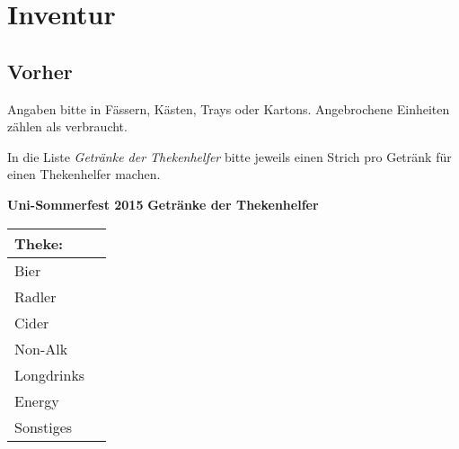 \section{Inventur}

\renewcommand{\arraystretch}{1.4}
\subsection{Vorher}
Angaben bitte in Fässern, Kästen, Trays oder Kartons. Angebrochene Einheiten zählen als verbraucht.

In die Liste \emph{Getränke der Thekenhelfer} bitte jeweils einen Strich pro Getränk für einen Thekenhelfer machen.
\cleardoublepage
{\large
\begin{center}
  \textbf{Uni-Sommerfest 2015} \hfill \textbf{Getränke der Thekenhelfer}\\[0.5cm]
\begin{tabular}{|p{2.5cm}|l|}
  \hline
  \multicolumn{2}{|l|}{\textbf{Theke:}  \hfill} \\
  \hline
  \multirow{3}{*}{Bier}
  &  \\
  &  \\
  &  \\
  \hline
  \multirow{3}{*}{Radler}
  &  \\
  &  \\
  &  \\
  \hline
  \multirow{3}{*}{Cider}
  &  \\
  &  \\
  &  \\
  \hline
  \multirow{4}{*}{Non-Alk}
  &  \\
  &  \\
  &  \\
  &  \\
  \hline
  \multirow{3}{*}{Longdrinks}
  &  \\
  &  \\
  &  \\
  \hline
  \multirow{3}{*}{Energy}
  &  \\
  &  \\
  &  \\
  \hline
  \multirow{3}{*}{Sonstiges}
  &  \\
  &  \\
  &  \\
  \hline

\end{tabular}
\end{center}
}
